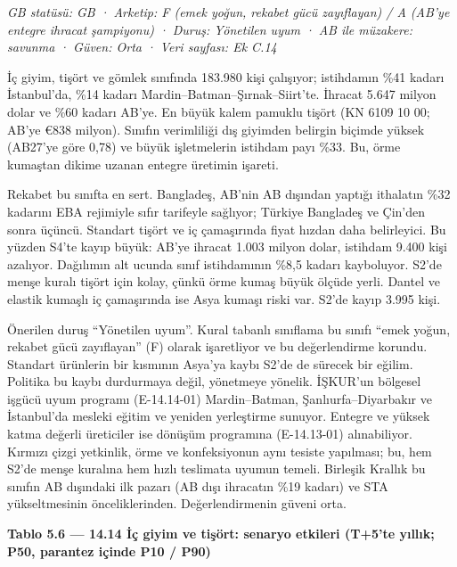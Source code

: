 \emph{GB statüsü: GB · Arketip: F (emek yoğun, rekabet gücü zayıflayan) / A (AB'ye entegre ihracat şampiyonu) · Duruş: Yönetilen uyum · AB ile müzakere: savunma · Güven: Orta · Veri sayfası: Ek C.14}

İç giyim, tişört ve gömlek sınıfında 183.980 kişi çalışıyor; istihdamın \%41 kadarı İstanbul'da, \%14 kadarı Mardin--Batman--Şırnak--Siirt'te. İhracat 5.647 milyon dolar ve \%60 kadarı AB'ye. En büyük kalem pamuklu tişört (KN 6109 10 00; AB'ye €838 milyon). Sınıfın verimliliği dış giyimden belirgin biçimde yüksek (AB27'ye göre 0,78) ve büyük işletmelerin istihdam payı \%33. Bu, örme kumaştan dikime uzanan entegre üretimin işareti.

Rekabet bu sınıfta en sert. Bangladeş, AB'nin AB dışından yaptığı ithalatın \%32 kadarını EBA rejimiyle sıfır tarifeyle sağlıyor; Türkiye Bangladeş ve Çin'den sonra üçüncü. Standart tişört ve iç çamaşırında fiyat hızdan daha belirleyici. Bu yüzden S4'te kayıp büyük: AB'ye ihracat 1.003 milyon dolar, istihdam 9.400 kişi azalıyor. Dağılımın alt ucunda sınıf istihdamının \%8,5 kadarı kayboluyor. S2'de menşe kuralı tişört için kolay, çünkü örme kumaş büyük ölçüde yerli. Dantel ve elastik kumaşlı iç çamaşırında ise Asya kumaşı riski var. S2'de kayıp 3.995 kişi.

Önerilen duruş ``Yönetilen uyum''. Kural tabanlı sınıflama bu sınıfı ``emek yoğun, rekabet gücü zayıflayan'' (F) olarak işaretliyor ve bu değerlendirme korundu. Standart ürünlerin bir kısmının Asya'ya kaybı S2'de de sürecek bir eğilim. Politika bu kaybı durdurmaya değil, yönetmeye yönelik. İŞKUR'un bölgesel işgücü uyum programı (E-14.14-01) Mardin--Batman, Şanlıurfa--Diyarbakır ve İstanbul'da mesleki eğitim ve yeniden yerleştirme sunuyor. Entegre ve yüksek katma değerli üreticiler ise dönüşüm programına (E-14.13-01) alınabiliyor. Kırmızı çizgi yetkinlik, örme ve konfeksiyonun aynı tesiste yapılması; bu, hem S2'de menşe kuralına hem hızlı teslimata uyumun temeli. Birleşik Krallık bu sınıfın AB dışındaki ilk pazarı (AB dışı ihracatın \%19 kadarı) ve STA yükseltmesinin önceliklerinden. Değerlendirmenin güveni orta.


\textbf{Tablo 5.6 --- 14.14 İç giyim ve tişört: senaryo etkileri (T+5'te yıllık; P50, parantez içinde P10 / P90)}

\nopagebreak[4]

\begingroup\gbtablo\small

